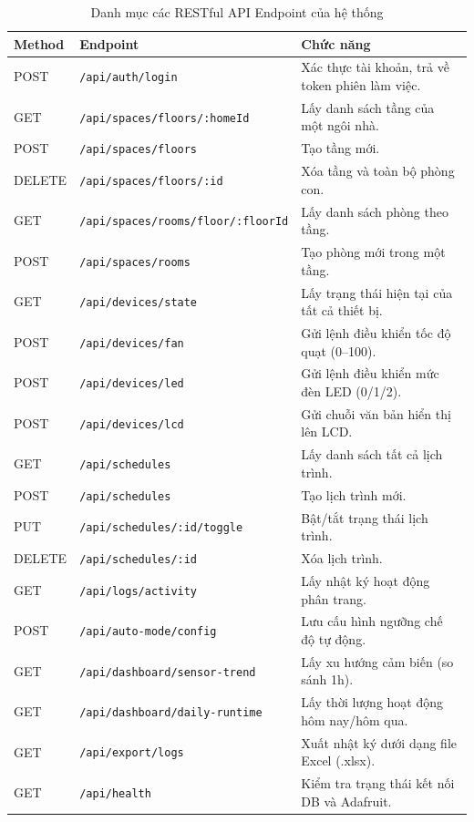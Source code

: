 \begin{table}[H]
\centering
\caption{Danh mục các RESTful API Endpoint của hệ thống}
\begin{tabular}{|l|l|p{6cm}|}
\hline
\textbf{Method} & \textbf{Endpoint} & \textbf{Chức năng} \\ \hline
POST & \texttt{/api/auth/login} & Xác thực tài khoản, trả về token phiên làm việc. \\ \hline
GET & \texttt{/api/spaces/floors/:homeId} & Lấy danh sách tầng của một ngôi nhà. \\ \hline
POST & \texttt{/api/spaces/floors} & Tạo tầng mới. \\ \hline
DELETE & \texttt{/api/spaces/floors/:id} & Xóa tầng và toàn bộ phòng con. \\ \hline
GET & \texttt{/api/spaces/rooms/floor/:floorId} & Lấy danh sách phòng theo tầng. \\ \hline
POST & \texttt{/api/spaces/rooms} & Tạo phòng mới trong một tầng. \\ \hline
GET & \texttt{/api/devices/state} & Lấy trạng thái hiện tại của tất cả thiết bị. \\ \hline
POST & \texttt{/api/devices/fan} & Gửi lệnh điều khiển tốc độ quạt (0–100). \\ \hline
POST & \texttt{/api/devices/led} & Gửi lệnh điều khiển mức đèn LED (0/1/2). \\ \hline
POST & \texttt{/api/devices/lcd} & Gửi chuỗi văn bản hiển thị lên LCD. \\ \hline
GET & \texttt{/api/schedules} & Lấy danh sách tất cả lịch trình. \\ \hline
POST & \texttt{/api/schedules} & Tạo lịch trình mới. \\ \hline
PUT & \texttt{/api/schedules/:id/toggle} & Bật/tắt trạng thái lịch trình. \\ \hline
DELETE & \texttt{/api/schedules/:id} & Xóa lịch trình. \\ \hline
GET & \texttt{/api/logs/activity} & Lấy nhật ký hoạt động phân trang. \\ \hline
POST & \texttt{/api/auto-mode/config} & Lưu cấu hình ngưỡng chế độ tự động. \\ \hline
GET & \texttt{/api/dashboard/sensor-trend} & Lấy xu hướng cảm biến (so sánh 1h). \\ \hline
GET & \texttt{/api/dashboard/daily-runtime} & Lấy thời lượng hoạt động hôm nay/hôm qua. \\ \hline
GET & \texttt{/api/export/logs} & Xuất nhật ký dưới dạng file Excel (.xlsx). \\ \hline
GET & \texttt{/api/health} & Kiểm tra trạng thái kết nối DB và Adafruit. \\ \hline
\end{tabular}
\end{table}


